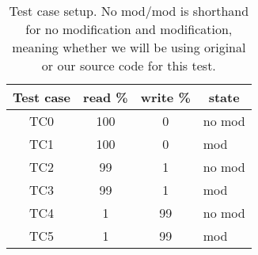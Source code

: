 \begin{center}
\begin{table}[h]
	\begin{tabular}{|c|c|c|l|}
		\multicolumn{1}{c}{Test case} & 
		\multicolumn{1}{c}{read \%} & 
		\multicolumn{1}{c}{write \%} & 
		\multicolumn{1}{c}{state} \\
		\hline

		TC0 & 100 & 0 & no mod \\
		TC1 & 100 & 0 & mod \\
		TC2 & 99 & 1 & no mod \\
		TC3 & 99 & 1 & mod \\
		TC4 & 1 & 99 & no mod \\
		TC5 & 1 & 99 & mod \\

		\hline
	\end{tabular}
	\caption{Test case setup. No mod/mod is shorthand for no modification and modification, meaning whether we will be using original or our source code for this test.}
	\label{tbl:testcases}
\end{table}
\end{center}
